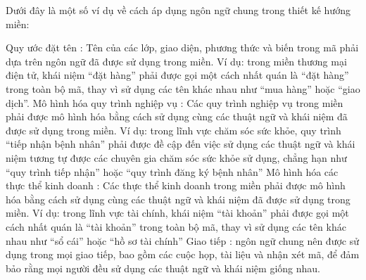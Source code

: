 Dưới đây là một số ví dụ về cách áp dụng ngôn ngữ chung trong thiết kế hướng miền:

Quy ước đặt tên : Tên của các lớp, giao diện, phương thức và biến trong mã phải dựa trên ngôn ngữ đã được sử dụng trong miền. Ví dụ: trong miền thương mại điện tử, khái niệm “đặt hàng” phải được gọi một cách nhất quán là “đặt hàng” trong toàn bộ mã, thay vì sử dụng các tên khác nhau như “mua hàng” hoặc “giao dịch”.
Mô hình hóa quy trình nghiệp vụ : Các quy trình nghiệp vụ trong miền phải được mô hình hóa bằng cách sử dụng cùng các thuật ngữ và khái niệm đã được sử dụng trong miền. Ví dụ: trong lĩnh vực chăm sóc sức khỏe, quy trình “tiếp nhận bệnh nhân” phải được đề cập đến việc sử dụng các thuật ngữ và khái niệm tương tự được các chuyên gia chăm sóc sức khỏe sử dụng, chẳng hạn như “quy trình tiếp nhận” hoặc “quy trình đăng ký bệnh nhân”
Mô hình hóa các thực thể kinh doanh : Các thực thể kinh doanh trong miền phải được mô hình hóa bằng cách sử dụng cùng các thuật ngữ và khái niệm đã được sử dụng trong miền. Ví dụ: trong lĩnh vực tài chính, khái niệm “tài khoản” phải được gọi một cách nhất quán là “tài khoản” trong toàn bộ mã, thay vì sử dụng các tên khác nhau như “sổ cái” hoặc “hồ sơ tài chính”
Giao tiếp : ngôn ngữ chung nên được sử dụng trong mọi giao tiếp, bao gồm các cuộc họp, tài liệu và nhận xét mã, để đảm bảo rằng mọi người đều sử dụng các thuật ngữ và khái niệm giống nhau.


